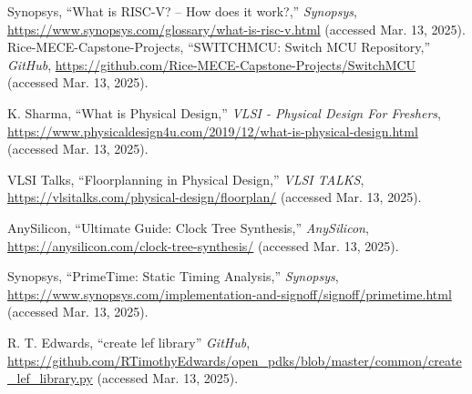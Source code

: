 \documentclass[conference]{IEEEtran}
\begin{document}
\begin{thebibliography}{00}
 Synopsys, “What is RISC-V? – How does it work?,” 
\emph{Synopsys}, \url{https://www.synopsys.com/glossary/what-is-risc-v.html} 
(accessed Mar. 13, 2025).
 Rice-MECE-Capstone-Projects, “SWITCHMCU: Switch MCU Repository,” 
\emph{GitHub}, \url{https://github.com/Rice-MECE-Capstone-Projects/SwitchMCU} 
(accessed Mar. 13, 2025).

 K. Sharma, “What is Physical Design,” 
\emph{VLSI - Physical Design For Freshers}, 
\url{https://www.physicaldesign4u.com/2019/12/what-is-physical-design.html} 
(accessed Mar. 13, 2025).

 VLSI Talks, “Floorplanning in Physical Design,” 
\emph{VLSI TALKS}, 
\url{https://vlsitalks.com/physical-design/floorplan/} 
(accessed Mar. 13, 2025).

 AnySilicon, “Ultimate Guide: Clock Tree Synthesis,” 
\emph{AnySilicon}, 
\url{https://anysilicon.com/clock-tree-synthesis/} 
(accessed Mar. 13, 2025).

 Synopsys, “PrimeTime: Static Timing Analysis,” 
\emph{Synopsys}, 
\url{https://www.synopsys.com/implementation-and-signoff/signoff/primetime.html} 
(accessed Mar. 13, 2025).

 R. T. Edwards, “create lef library” 
\emph{GitHub}, 
\url{https://github.com/RTimothyEdwards/open_pdks/blob/master/common/create_lef_library.py} 
(accessed Mar. 13, 2025).

\end{thebibliography}
\end{document}
